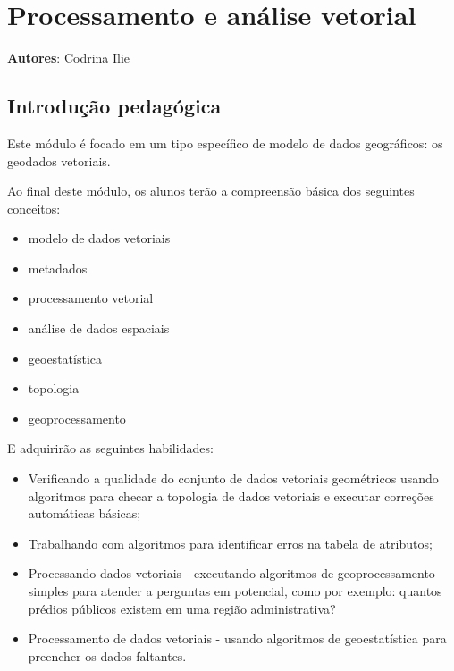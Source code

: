 \documentclass[
  portuguese,
]{krantz}
\providecommand{\tightlist}{%
  \setlength{\itemsep}{0pt}\setlength{\parskip}{0pt}}
\begin{document}
\hypertarget{processamento-e-anuxe1lise-vetorial}{%
\chapter{\texorpdfstring{\textbf{Processamento e análise vetorial}}{Processamento e análise vetorial}}\label{processamento-e-anuxe1lise-vetorial}}

\textbf{Autores}: Codrina Ilie

\hypertarget{introduuxe7uxe3o-pedaguxf3gica-8}{%
\section{Introdução pedagógica}\label{introduuxe7uxe3o-pedaguxf3gica-8}}

Este módulo é focado em um tipo específico de modelo de dados geográficos: os geodados vetoriais.

Ao final deste módulo, os alunos terão a compreensão básica dos seguintes conceitos:

\begin{itemize}
\tightlist
\item
  modelo de dados vetoriais
\item
  metadados
\item
  processamento vetorial
\item
  análise de dados espaciais
\item
  geoestatística
\item
  topologia
\item
  geoprocessamento
\end{itemize}

E adquirirão as seguintes habilidades:

\begin{itemize}
\tightlist
\item
  Verificando a qualidade do conjunto de dados vetoriais geométricos usando algoritmos para checar a topologia de dados vetoriais e executar correções automáticas básicas;
\item
  Trabalhando com algoritmos para identificar erros na tabela de atributos;
\item
  Processando dados vetoriais - executando algoritmos de geoprocessamento simples para atender a perguntas em potencial, como por exemplo: quantos prédios públicos existem em uma região administrativa?
\item
  Processamento de dados vetoriais - usando algoritmos de geoestatística para preencher os dados faltantes.
\end{itemize}
\end{document}
